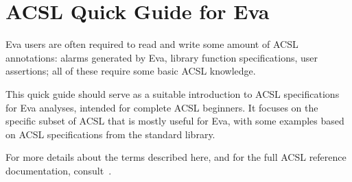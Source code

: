 \documentclass[web]{frama-c-book}
\newcommand{\Eva}{\textsf{Eva}}
\begin{document}





\appendix
\chapter{ACSL Quick Guide for Eva}
\label{sec:acsl-quick-guide}

\Eva{} users are often required to read and write some amount of ACSL
annotations: alarms generated by \Eva{}, library function specifications,
user assertions; all of these require some basic ACSL knowledge.

This quick guide should serve as a suitable introduction to ACSL specifications
for \Eva{} analyses, intended for complete ACSL beginners.
It focuses on the specific subset of ACSL that is mostly useful for \Eva{}, with
some examples based on ACSL specifications from the \FramaC standard library.

For more details about the terms described here, and for the full
ACSL reference documentation, consult~\cite{acsl}.
\end{document}
